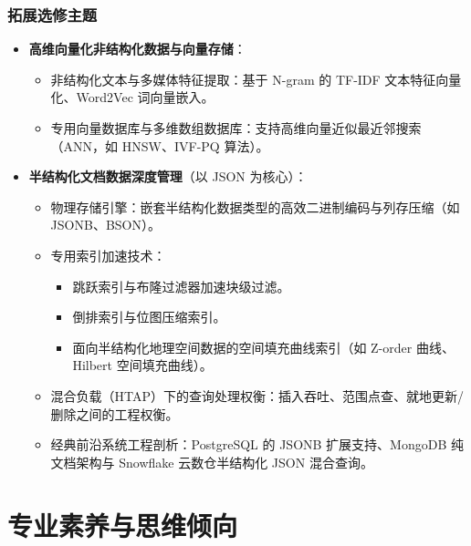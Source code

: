 \subsubsection{拓展选修主题}
\begin{itemize}
    \item \textbf{高维向量化非结构化数据与向量存储}：
    \begin{itemize}
        \item 非结构化文本与多媒体特征提取：基于 N-gram 的 TF-IDF 文本特征向量化、Word2Vec 词向量嵌入。
        \item 专用向量数据库与多维数组数据库：支持高维向量近似最近邻搜索（ANN，如 HNSW、IVF-PQ 算法）。
    \end{itemize}
    \item \textbf{半结构化文档数据深度管理}（以 JSON 为核心）：
    \begin{itemize}
        \item 物理存储引擎：嵌套半结构化数据类型的高效二进制编码与列存压缩（如 JSONB、BSON）。
        \item 专用索引加速技术：
        \begin{itemize}
            \item 跳跃索引与布隆过滤器加速块级过滤。
            \item 倒排索引与位图压缩索引。
            \item 面向半结构化地理空间数据的空间填充曲线索引（如 Z-order 曲线、Hilbert 空间填充曲线）。
        \end{itemize}
        \item 混合负载（HTAP）下的查询处理权衡：插入吞吐、范围点查、就地更新/删除之间的工程权衡。
        \item 经典前沿系统工程剖析：PostgreSQL 的 JSONB 扩展支持、MongoDB 纯文档架构与 Snowflake 云数仓半结构化 JSON 混合查询。
    \end{itemize}
\end{itemize}

\section{专业素养与思维倾向}

